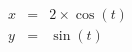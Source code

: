 \documentclass{article}
\begin{document}
\begin{eqnarray*}
x&=&2\times \cos\left( t \right)\\
y&=&\sin\left( t \right)\\
\end{eqnarray*}
\end{document}
